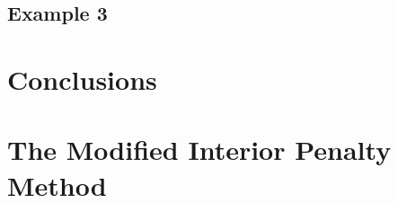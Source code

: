 \documentclass[preprint,review,10pt]{elsarticle}
\begin{document}
\subsection{Example 3} \label{sec::results_E3}

\section{Conclusions} \label{sec::conclusions}






\appendix
\section{The Modified Interior Penalty Method} \label{app::MIP}
\end{document}
